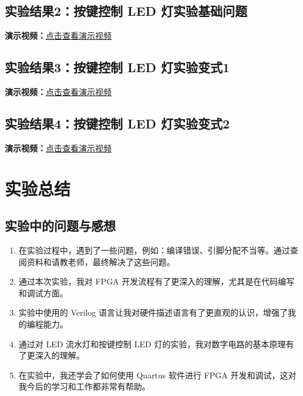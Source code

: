 \documentclass[UTF8]{article}
\theoremstyle{MyLineTheoremStyle} %
\theoremstyle{MyBlockTheoremStyle} %
\theoremstyle{MySubsubsectionStyle} %
\begin{document}
\subsection{实验结果2：按键控制 LED 灯实验基础问题}
\noindent
\textbf{演示视频：}\href{https://www.bilibili.com/video/BV1c1VtzYEpA/?share_source=copy_web&vd_source=4fd6c4265e65c0785c912874692a3971}{点击查看演示视频}

\subsection{实验结果3：按键控制 LED 灯实验变式1}
\noindent
\textbf{演示视频：}\href{https://www.bilibili.com/video/BV1AyVtzPEPV/?share_source=copy_web&vd_source=4fd6c4265e65c0785c912874692a3971}{点击查看演示视频}

\subsection{实验结果4：按键控制 LED 灯实验变式2}
\noindent
\textbf{演示视频：}\href{https://www.bilibili.com/video/BV1wyVtzPE7z/?share_source=copy_web&vd_source=4fd6c4265e65c0785c912874692a3971}{点击查看演示视频}



\section{实验总结}

\subsection{实验中的问题与感想}

\begin{enumerate}
    \item 在实验过程中，遇到了一些问题，例如：编译错误、引脚分配不当等。通过查阅资料和请教老师，最终解决了这些问题。
    \item 通过本次实验，我对 FPGA 开发流程有了更深入的理解，尤其是在代码编写和调试方面。
    \item 实验中使用的 Verilog 语言让我对硬件描述语言有了更直观的认识，增强了我的编程能力。
    \item 通过对 LED 流水灯和按键控制 LED 灯的实验，我对数字电路的基本原理有了更深入的理解。
    \item 在实验中，我还学会了如何使用 Quartus 软件进行 FPGA 开发和调试，这对我今后的学习和工作都非常有帮助。
\end{enumerate}

\cleardoublepage
\end{document}

